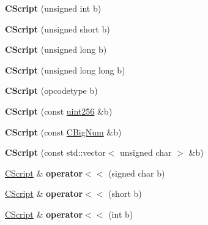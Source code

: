 \begin{DoxyCompactItemize}
\mbox{\label{class_c_script_a1e0a3f8b4dc8242c5a4999b03c2a29bb}} 
{\bfseries C\+Script} (unsigned int b)
\item 
\mbox{\label{class_c_script_a00ae1d612664442f4bebc03a73ac53b1}} 
{\bfseries C\+Script} (unsigned short b)
\item 
\mbox{\label{class_c_script_af3752b74d2be0a0369656da523a1323a}} 
{\bfseries C\+Script} (unsigned long b)
\item 
\mbox{\label{class_c_script_a87b5b220479a53bd33de58aa58517cd8}} 
{\bfseries C\+Script} (unsigned long long b)
\item 
\mbox{\label{class_c_script_a8214376dea81245d33a44a2ea7c2cdc3}} 
{\bfseries C\+Script} (opcodetype b)
\item 
\mbox{\label{class_c_script_ac6e18fc38394ffe9106d9a92e89de1f6}} 
{\bfseries C\+Script} (const \mbox{\hyperlink{classuint256}{uint256}} \&b)
\item 
\mbox{\label{class_c_script_a014fc30e86c347e56e0209f162a1ccf5}} 
{\bfseries C\+Script} (const \mbox{\hyperlink{class_c_big_num}{C\+Big\+Num}} \&b)
\item 
\mbox{\label{class_c_script_ab2348dd32f252c468f793ec290924603}} 
{\bfseries C\+Script} (const std\+::vector$<$ unsigned char $>$ \&b)
\item 
\mbox{\label{class_c_script_abdf14321fc2c312c6511d71a93c3e203}} 
\mbox{\hyperlink{class_c_script}{C\+Script}} \& {\bfseries operator$<$$<$} (signed char b)
\item 
\mbox{\label{class_c_script_adeaf67a2297341084f491391c5e30dbc}} 
\mbox{\hyperlink{class_c_script}{C\+Script}} \& {\bfseries operator$<$$<$} (short b)
\item 
\mbox{\label{class_c_script_a9ee5ba660433d0a94dc878abb6a52cb7}} 
\mbox{\hyperlink{class_c_script}{C\+Script}} \& {\bfseries operator$<$$<$} (int b)
\item 

\end{DoxyCompactItemize}
